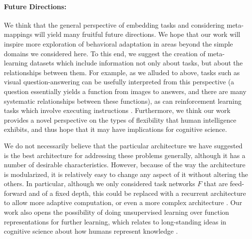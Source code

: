 \documentclass{article}
\begin{document}
\paragraph{Future Directions:} We think that the general perspective of embedding tasks and considering meta-mappings will yield many fruitful future directions. We hope that our work will inspire more exploration of behavioral adaptation in areas beyond the simple domains we considered here. To this end, we suggest the creation of meta-learning datasets which include information not only about tasks, but about the relationships between them. For example, as we alluded to above, tasks such as visual question-answering \citep[e.g.][]{Antol2015} can be usefully interpreted from this perspective (a question essentially yields a function from images to answers, and there are many systematic relationships between these functions), as can reinforcement learning tasks which involve executing instructions \citep[e.g.][]{Hermann2017, Co-Reyes2019}. Furthermore, we think our work provides a novel perspective on the types of flexibility that human intelligence exhibits, and thus hope that it may have implications for cognitive science. \par 
We do not necessarily believe that the particular architecture we have suggested is the best architecture for addressing these problems generally, although it has a number of desirable characteristics. However, because of the way the architecture is modularized, it is relatively easy to change any aspect of it without altering the others. In particular, although we only considered task networks $F$ that are feed-forward and of a fixed depth, this could be replaced with a recurrent architecture to allow more adaptive computation, or even a more complex architecture \citep[e.g.][]{Reed2015, Graves2016}. Our work also opens the possibility of doing unsupervised learning over function representations for further learning, which relates to long-standing ideas in cognitive science about how humans represent knowledge \citep{Clark1993}. \par 
\end{document}
